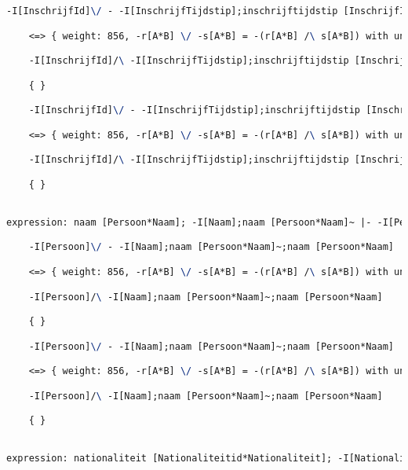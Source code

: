 \begin{lstlisting}[language=TeX]
    -I[InschrijfId]\/ - -I[InschrijfTijdstip];inschrijftijdstip [InschrijfId*InschrijfTijdstip]~;inschrijftijdstip [InschrijfId*InschrijfTijdstip]

    <=> { weight: 856, -r[A*B] \/ -s[A*B] = -(r[A*B] /\ s[A*B]) with unifier: {A->I[InschrijfId], B->I[InschrijfId], r->inschrijftijdstip [InschrijfId*InschrijfTijdstip];-I[InschrijfTijdstip];inschrijftijdstip [InschrijfId*InschrijfTijdstip]~, s->I[InschrijfId]} }

    -I[InschrijfId]/\ -I[InschrijfTijdstip];inschrijftijdstip [InschrijfId*InschrijfTijdstip]~;inschrijftijdstip [InschrijfId*InschrijfTijdstip]

    { }

    -I[InschrijfId]\/ - -I[InschrijfTijdstip];inschrijftijdstip [InschrijfId*InschrijfTijdstip]~;inschrijftijdstip [InschrijfId*InschrijfTijdstip]

    <=> { weight: 856, -r[A*B] \/ -s[A*B] = -(r[A*B] /\ s[A*B]) with unifier: {A->I[InschrijfId], B->I[InschrijfId], r->I[InschrijfId], s->inschrijftijdstip [InschrijfId*InschrijfTijdstip];-I[InschrijfTijdstip];inschrijftijdstip [InschrijfId*InschrijfTijdstip]~} }

    -I[InschrijfId]/\ -I[InschrijfTijdstip];inschrijftijdstip [InschrijfId*InschrijfTijdstip]~;inschrijftijdstip [InschrijfId*InschrijfTijdstip]

    { }


expression: naam [Persoon*Naam]; -I[Naam];naam [Persoon*Naam]~ |- -I[Persoon]

    -I[Persoon]\/ - -I[Naam];naam [Persoon*Naam]~;naam [Persoon*Naam]

    <=> { weight: 856, -r[A*B] \/ -s[A*B] = -(r[A*B] /\ s[A*B]) with unifier: {A->I[Persoon], B->I[Persoon], r->naam [Persoon*Naam];-I[Naam];naam [Persoon*Naam]~, s->I[Persoon]} }

    -I[Persoon]/\ -I[Naam];naam [Persoon*Naam]~;naam [Persoon*Naam]

    { }

    -I[Persoon]\/ - -I[Naam];naam [Persoon*Naam]~;naam [Persoon*Naam]

    <=> { weight: 856, -r[A*B] \/ -s[A*B] = -(r[A*B] /\ s[A*B]) with unifier: {A->I[Persoon], B->I[Persoon], r->I[Persoon], s->naam [Persoon*Naam];-I[Naam];naam [Persoon*Naam]~} }

    -I[Persoon]/\ -I[Naam];naam [Persoon*Naam]~;naam [Persoon*Naam]

    { }


expression: nationaliteit [Nationaliteitid*Nationaliteit]; -I[Nationaliteit];nationaliteit [Nationaliteitid*Nationaliteit]~ |- -I[Nationaliteitid]


\end{lstlisting}
